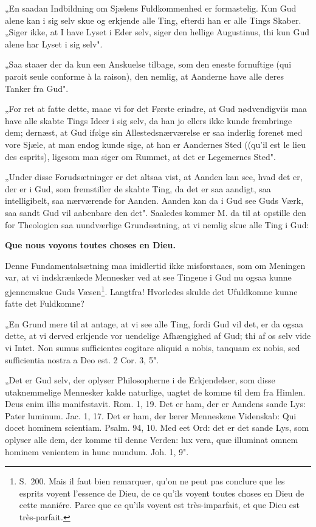 \documentclass[12pt,a4paper]{article}
\newcommand{\opage}[1]{\marginnote{\footnotesize\textit{[#1]}}}
\begin{document}
„En saadan Indbildning om Sjælens Fuldkommenhed er formastelig. Kun Gud alene
kan i sig selv skue og erkjende alle Ting, efterdi han er alle Tings Skaber.
„Siger ikke, at I have Lyset i Eder selv, siger den hellige Augustinus, thi kun
Gud alene har Lyset i sig selv".

„Saa staaer der da kun een Anskuelse tilbage, som den eneste fornuftige (qui
paroit seule conforme à la raison), den nemlig, at Aanderne have alle deres
Tanker fra Gud".

„For ret at fatte dette, maae vi for det Første erindre, at Gud nødvendigviis
maa have alle skabte Tings Ideer i sig selv, da han jo ellers ikke kunde
frembringe dem; dernæst, at Gud ifølge sin Allestedsnærværelse er saa inderlig
forenet med vore Sjæle, at man endog kunde sige, at han er Aandernes Sted
((qu'il est le lieu des esprits), ligesom man siger om Rummet, at det er
Legemernes Sted".

„Under disse Forudsætninger er det altsaa vist, at Aanden kan see, hvad det er,
der er i Gud, som fremstiller de skabte Ting, da det er saa aandigt, saa
intelligibelt, saa nærværende for Aanden. Aanden kan da i Gud see Guds Værk, saa
sandt Gud vil aabenbare den det".
\opage{16} Saaledes kommer M. da til at opstille den for Theologien saa uundværlige
Grundsætning, at vi nemlig skue alle Ting i Gud:

\begin{center}
\textbf{Que nous voyons toutes choses en Dieu.}
\end{center}

Denne Fundamentalsætning maa imidlertid ikke misforstaaes, som om Meningen var,
at vi indskrænkede Mennesker ved at see Tingene i Gud nu ogsaa kunne gjennemskue
Guds Væsen\footnote{S.~200. Mais il faut bien remarquer, qu'on ne peut pas
conclure que les esprits voyent l'essence de Dieu, de ce qu'ils voyent toutes
choses en Dieu de cette maniére. Parce que ce qu'ils voyent est très-imparfait,
et que Dieu est très-parfait.}. Langtfra! Hvorledes skulde det Ufuldkomne kunne
fatte det Fuldkomne?

„En Grund mere til at antage, at vi see alle Ting, fordi Gud vil det, er da
ogsaa dette, at vi derved erkjende vor uendelige Afhængighed af Gud; thi af os
selv vide vi Intet. Non sumus sufficientes cogitare aliquid a nobis, tanquam ex
nobis, sed sufficientia nostra a Deo est. 2 Cor. 3, 5".

„Det er Gud selv, der oplyser Philosopherne i de Erkjendelser, som disse
utaknemmelige Mennesker kalde naturlige, uagtet de komme til dem fra Himlen. Deus
enim illis manifestavit. Rom. 1, 19. Det er ham, der er Aandens sande Lys: Pater
luminum. Jac. 1, 17. Det er ham, der lærer Menneskene Videnskab: Qui docet
hominem scientiam. Psalm. 94, 10. Med eet Ord: det er det sande Lys, som oplyser
alle dem, der komme til denne Verden: lux vera, quæ illuminat omnem hominem
venientem in hunc mundum. Joh. 1, 9".
\end{document}
